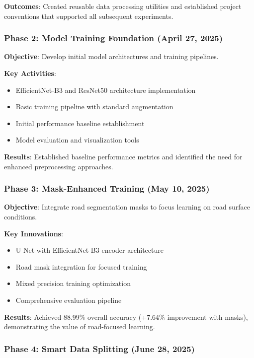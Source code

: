 \documentclass[12pt]{article}
\begin{document}
\textbf{Outcomes}: Created reusable data processing utilities and established project conventions that supported all subsequent experiments.

\subsubsection{Phase 2: Model Training Foundation (April 27, 2025)}

\textbf{Objective}: Develop initial model architectures and training pipelines.

\textbf{Key Activities}:
\begin{itemize}[itemsep=1pt,parsep=0pt,topsep=2pt]
\item EfficientNet-B3 and ResNet50 architecture implementation
\item Basic training pipeline with standard augmentation
\item Initial performance baseline establishment
\item Model evaluation and visualization tools
\end{itemize}

\textbf{Results}: Established baseline performance metrics and identified the need for enhanced preprocessing approaches.

\subsubsection{Phase 3: Mask-Enhanced Training (May 10, 2025)}

\textbf{Objective}: Integrate road segmentation masks to focus learning on road surface conditions.

\textbf{Key Innovations}:
\begin{itemize}[itemsep=1pt,parsep=0pt,topsep=2pt]
\item U-Net with EfficientNet-B3 encoder architecture
\item Road mask integration for focused training
\item Mixed precision training optimization
\item Comprehensive evaluation pipeline
\end{itemize}

\textbf{Results}: Achieved 88.99\% overall accuracy (+7.64\% improvement with masks), demonstrating the value of road-focused learning.

\subsubsection{Phase 4: Smart Data Splitting (June 28, 2025)}
\end{document}
